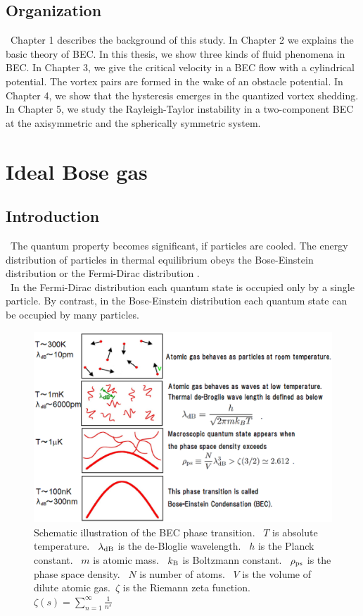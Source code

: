 \documentclass[12pt,a4paper]{report}
\newcommand{\kb} {k_{\rm B}}				            %
\begin{document}
\section{Organization}
\ Chapter 1 describes the background of this study.
In Chapter 2 we explains the basic theory of BEC.
In this thesis, we show three kinds of fluid phenomena in BEC.
In Chapter 3, we give the critical velocity in a BEC flow with 
 a cylindrical potential. The vortex pairs are formed in the wake of an obstacle potential.
In Chapter 4, we show that the hysteresis emerges in the quantized vortex shedding.
In Chapter 5, we study the Rayleigh-Taylor instability in a two-component BEC at 
the axisymmetric and the spherically symmetric system.

\chapter{Ideal Bose gas}
\section {Introduction }
\ The quantum property becomes significant, if particles are cooled.
The energy distribution of particles in thermal equilibrium obeys
the Bose-Einstein distribution or the Fermi-Dirac distribution \cite{13}\cite{14}.
\\
\ In the Fermi-Dirac distribution each quantum state is occupied only by a single particle.
By contrast, in the Bose-Einstein distribution each quantum state can be occupied by many particles.
\begin{figure}[htbp]
\begin{center}
\includegraphics[scale=0.40, keepaspectratio]{2-1.eps}
\caption{
Schematic illustration of the BEC phase transition. \ $T$ is absolute temperature.
\ ${\lambda_{\rm dB}}$ is the de-Bloglie wavelength. \ $h$ is the Planck constant.
\ $m$ is atomic mass.
\ $\kb$ is Boltzmann constant. \ $\rho_{{\rm ps}}$ is the phase space density.
\ $N$ is number of atoms. \ $V$ is the volume of dilute atomic gas.\ $\zeta$ is the Riemann zeta function.
$\zeta(s)=\sum_{n=1}^\infty \frac{1}{n^s}$
}
\label{FIG:2-1}
\end{center}
\end{figure}
\end{document}
